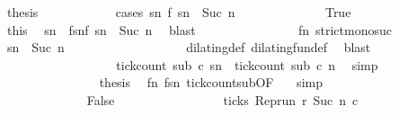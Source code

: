 \begin{isabellebody}
\ {\isacharquery}thesis\isanewline
\ \ \ \ \ \ \ \ \ \ \isamarkupfalse%
\ {\isacharparenleft}cases\ {\isacartoucheopen}{\isasymexists}sn\ f\ sn\ {\isacharequal}\ Suc\ n{\isacartoucheclose}{\isacharparenright}\isanewline
\ \ \ \ \ \ \ \ \ \ \ \ \isamarkupfalse%
\ True\ %
\isanewline
\ \ \ \ \ \ \ \ \ \ \ \ \ \ \isamarkupfalse%
\ this\ \isamarkupfalse%
\ sn\ \ fsn{\isacharcolon}{\isacartoucheopen}f\ sn\ {\isacharequal}\ Suc\ n{\isacartoucheclose}\ \isamarkupfalse%
\ blast\isanewline
\ \ \ \ \ \ \ \ \ \ \ \ \ \ \isamarkupfalse%
\ fn\ strict{\isacharunderscore}mono{\isacharunderscore}suc\ {\isacharasterisk}\ \isamarkupfalse%
\ {\isacartoucheopen}sn\ {\isacharequal}\ Suc\ n\isanewline
\ \ \ \ \ \ \ \ \ \ \ \ \ \ \ \ \isamarkupfalse%
\ \ dilating{\isacharunderscore}def\ dilating{\isacharunderscore}fun{\isacharunderscore}def\ \isamarkupfalse%
\ blast\isanewline
\ \ \ \ \ \ \ \ \ \ \ \ \ \ \isamarkupfalse%
\ {}\ \isamarkupfalse%
\ {\isacartoucheopen}tick{\isacharunderscore}count\ sub\ c\ sn\ {\isasymle}\ tick{\isacharunderscore}count\ sub\ c\ n\ \isamarkupfalse%
\ simp\isanewline
\ \ \ \ \ \ \ \ \ \ \ \ \ \ \isamarkupfalse%
\ {\isacharquery}thesis\ \isamarkupfalse%
\ fn\ fsn\ tick{\isacharunderscore}count{\isacharunderscore}sub{\isacharbrackleft}OF\ {\isacharasterisk}{\isacharbrackright}\ \isamarkupfalse%
\ simp\isanewline
\ \ \ \ \ \ \ \ \ \ \isamarkupfalse%
\isanewline
\ \ \ \ \ \ \ \ \ \ \ \ \isamarkupfalse%
\ False\ %
\isanewline
\ \ \ \ \ \ \ \ \ \ \ \ \ \ \isamarkupfalse%
\ {\isacartoucheopen}{\isasymnot}ticks\ {\isacharparenleft}{\isacharparenleft}Rep{\isacharunderscore}run\ r{\isacharparenright}\ {\isacharparenleft}Suc\ n{\isacharparenright}\ c\isanewline
\ \ \ \ \ \ \ \ \ \ \ \ \ \ \ \ \isamarkupfalse%
\ {\isacharasterisk}\ \isamarkupfalse%

\end{isabellebody}
